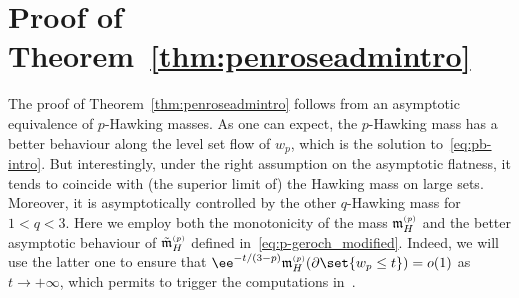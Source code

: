\documentclass[10pt,a4paper]{amsart}
\numberwithin{equation}{section}
\newcommand{\ma}{\mathfrak{m}}
\newcommand{\tp}[1][p]{{\text{\tiny$(#1)$}}}
\begin{document}
\section{Proof of Theorem~\ref{thm:penroseadmintro}}
\pushQED{\qed}
The proof of Theorem~\ref{thm:penroseadmintro} follows from an asymptotic equivalence of $p$-Hawking masses. As one can expect, the $p$-Hawking mass has a better behaviour along the level set flow of $w_p$, which is the solution to~\eqref{eq:pb-intro}. But interestingly, under the right assumption on the asymptotic flatness, it tends to coincide with (the superior limit of) the Hawking mass on large sets. Moreover, it is asymptotically controlled by the other $q$-Hawking mass for $1<q<3$. Here we employ both the monotonicity of the mass $\ma^{\tp}_H$ and the better asymptotic behaviour of $\tilde{\ma}^{\tp}_H$ defined in~\eqref{eq:p-geroch_modified}. Indeed, we will use the latter one to ensure that $\ee^{-t/(3-p)} \ma^{\tp}_H(\partial \set{w_p \leq t})=o(1)$ as $t \to +\infty$, which permits to trigger the computations in~\cite[formula~(2.12)]{agostiniani_riemannianpenroseinequalitynonlinear_2022}.
\end{document}
